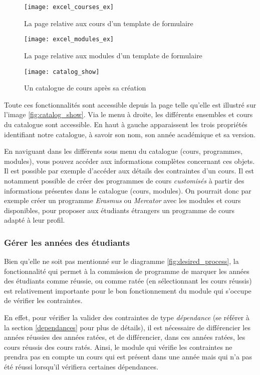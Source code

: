 \begin{figure}
\centering
\caption{La page relative aux cours d'un template de formulaire}
\label{fig:excel_courses_ex}
\texttt{[image: excel\_courses\_ex]}
\end{figure}

\begin{figure}
\centering
\caption{La page relative aux modules d'un template de formulaire}
\label{fig:excel_modules_ex}
\texttt{[image: excel\_modules\_ex]}
\end{figure}

\begin{figure}
\centering
\caption{Un catalogue de cours après sa création}
\label{catalog_show}
\texttt{[image: catalog\_show]}
\end{figure}

Toute ces fonctionnalités sont accessible depuis la page telle qu'elle est illustré sur l'image \ref{fig:catalog_show}. Via le menu à droite, les différents ensembles et cours du catalogue sont accessible. En haut à gauche apparaissent les trois propriétés identifiant notre catalogue, à savoir son nom, son année académique et sa version. 

En naviguant dans les différents sous menu du catalogue (cours, programmes, modules), vous pouvez accéder aux informations complètes concernant ces objets. Il est possible par exemple d'accéder aux détails des contraintes d'un cours. Il est notamment possible de créer des programmes de cours \textit{customisés} à partir des informations présentes dans le catalogue (cours, modules). On pourrait donc par exemple créer un programme \textit{Erasmus} ou \textit{Mercator} avec les modules et cours disponibles, pour proposer aux étudiants étrangers un programme de cours adapté à leur profil.

\subsubsection{Gérer les années des étudiants}
Bien qu'elle ne soit pas mentionné sur le diagramme \ref{fig:desired_process}, la fonctionnalité qui permet à la commission de programme de marquer les années des étudiants comme réussie, ou comme ratée (en sélectionnant les cours réussis) est relativement importante pour le bon fonctionnement du module qui s'occupe de vérifier les contraintes. 


En effet, pour vérifier la valider des contraintes de type \textit{dépendance} (se référer à  la section \ref{dependances} pour plus de détails), il est nécessaire de différencier les années réussies des années ratées, et de différencier, dans ces années ratées, les cours réussis des cours ratés. Ainsi, le module qui vérifie les contraintes ne prendra pas en compte un cours qui est présent dans une année mais qui n'a pas été réussi lorsqu'il vérifiera certaines dépendances. 


